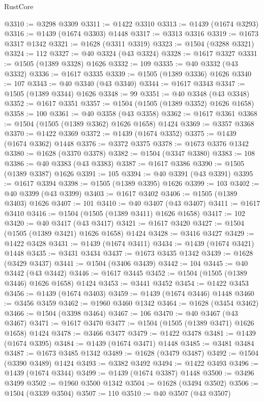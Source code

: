 \begin{lexlean}{RustCore}
\begin{coremodule}
@3310 := @3298 @3309
@3311 := @1422 @3310
@3313 := @1439 (@1674 @3293)
@3316 := @1439 (@1674 @3303) @1448
@3317 := @3313 @3316
@3319 := @1673 @3317 @1342
@3321 := @1628 (@3311 @3319)
@3323 := @1504 (@3288 @3321)
@3324 := 112
@3327 := @40 @3324 (@43 @3324)
@3328 := @1617 @3327
@3331 := @1505 (@1389 @3328) @1626
@3332 := 109
@3335 := @40 @3332 (@43 @3332)
@3336 := @1617 @3335
@3339 := @1505 (@1389 @3336) @1626
@3340 := 107
@3343 := @40 @3340 (@43 @3340)
@3344 := @1617 @3343
@3347 := @1505 (@1389 @3344) @1626
@3348 := 99
@3351 := @40 @3348 (@43 @3348)
@3352 := @1617 @3351
@3357 := @1504 (@1505 (@1389 @3352) @1626 @1658)
@3358 := 100
@3361 := @40 @3358 (@43 @3358)
@3362 := @1617 @3361
@3368 := @1504 (@1505 (@1389 @3362) @1626 @1658) @1424
@3369 := @3357 @3368
@3370 := @1422 @3369
@3372 := @1439 (@1674 @3352)
@3375 := @1439 (@1674 @3362) @1448
@3376 := @3372 @3375
@3378 := @1673 @3376 @1342
@3380 := @1628 (@3370 @3378)
@3382 := @1504 (@3347 @3380)
@3383 := 108
@3386 := @40 @3383 (@43 @3383)
@3387 := @1617 @3386
@3390 := @1505 (@1389 @3387) @1626
@3391 := 105
@3394 := @40 @3391 (@43 @3391)
@3395 := @1617 @3394
@3398 := @1505 (@1389 @3395) @1626
@3399 := 103
@3402 := @40 @3399 (@43 @3399)
@3403 := @1617 @3402
@3406 := @1505 (@1389 @3403) @1626
@3407 := 101
@3410 := @40 @3407 (@43 @3407)
@3411 := @1617 @3410
@3416 := @1504 (@1505 (@1389 @3411) @1626 @1658)
@3417 := 102
@3420 := @40 @3417 (@43 @3417)
@3421 := @1617 @3420
@3427 := @1504 (@1505 (@1389 @3421) @1626 @1658) @1424
@3428 := @3416 @3427
@3429 := @1422 @3428
@3431 := @1439 (@1674 @3411)
@3434 := @1439 (@1674 @3421) @1448
@3435 := @3431 @3434
@3437 := @1673 @3435 @1342
@3439 := @1628 (@3429 @3437)
@3441 := @1504 (@3406 @3439)
@3442 := 104
@3445 := @40 @3442 (@43 @3442)
@3446 := @1617 @3445
@3452 := @1504 (@1505 (@1389 @3446) @1626 @1658) @1424
@3453 := @3441 @3452
@3454 := @1422 @3453
@3456 := @1439 (@1674 @3403)
@3459 := @1439 (@1674 @3446) @1448
@3460 := @3456 @3459
@3462 := @1960 @3460 @1342
@3464 := @1628 (@3454 @3462)
@3466 := @1504 (@3398 @3464)
@3467 := 106
@3470 := @40 @3467 (@43 @3467)
@3471 := @1617 @3470
@3477 := @1504 (@1505 (@1389 @3471) @1626 @1658) @1424
@3478 := @3466 @3477
@3479 := @1422 @3478
@3481 := @1439 (@1674 @3395)
@3484 := @1439 (@1674 @3471) @1448
@3485 := @3481 @3484
@3487 := @1673 @3485 @1342
@3489 := @1628 (@3479 @3487)
@3492 := @1504 (@3390 @3489) @1424
@3493 := @3382 @3492
@3494 := @1422 @3493
@3496 := @1439 (@1674 @3344)
@3499 := @1439 (@1674 @3387) @1448
@3500 := @3496 @3499
@3502 := @1960 @3500 @1342
@3504 := @1628 (@3494 @3502)
@3506 := @1504 (@3339 @3504)
@3507 := 110
@3510 := @40 @3507 (@43 @3507)

\end{coremodule}
\end{lexlean}
